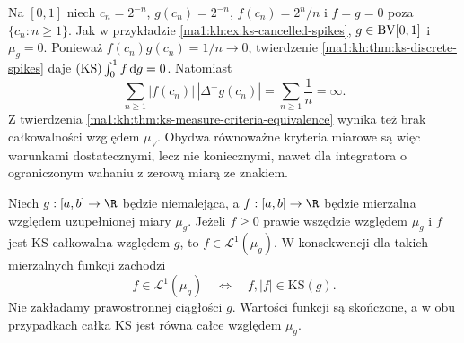 \begin{przyklad}\label{ma1:kh:ex:ks-nonsummable-spikes}
Na $[0,1]$ niech $c_n=2^{-n}$, $g(c_n)=2^{-n}$, $f(c_n)=2^n/n$ i $f=g=0$ poza $\{c_n:n\ge1\}$. Jak w przykładzie \ref{ma1:kh:ex:ks-cancelled-spikes}, $g\in\mathrm{BV}[0,1]$ i $\mu_g=0$. Ponieważ $f(c_n)g(c_n)=1/n\to0$, twierdzenie \ref{ma1:kh:thm:ks-discrete-spikes} daje $(\mathrm{KS})\int_0^1 f\,\mathrm dg=0$. Natomiast
\[
 \sum_{n\ge1}|f(c_n)|\,|\Delta^+g(c_n)|=\sum_{n\ge1}\frac1n=\infty.
\]
Z twierdzenia \ref{ma1:kh:thm:ks-measure-criteria-equivalence} wynika też brak całkowalności względem $\mu_V$. Obydwa równoważne kryteria miarowe są więc warunkami dostatecznymi, lecz nie koniecznymi, nawet dla integratora o ograniczonym wahaniu z zerową miarą ze znakiem.
\end{przyklad}
\begin{twierdzenie}\label{ma1:kh:thm:ks-absolute-monotone}
Niech $g:[a,b]\to\R$ będzie niemalejąca, a $f:[a,b]\to\R$ będzie mierzalna względem uzupełnionej miary $\mu_g$. Jeżeli $f\ge0$ prawie wszędzie względem $\mu_g$ i $f$ jest KS-całkowalna względem $g$, to $f\in\mathcal L^1(\mu_g)$. W konsekwencji dla takich mierzalnych funkcji zachodzi
\[
 f\in\mathcal L^1(\mu_g)\quad\Longleftrightarrow\quad
 f,|f|\in\mathrm{KS}(g).
\]
Nie zakładamy prawostronnej ciągłości $g$. Wartości funkcji są skończone, a w obu przypadkach całka KS jest równa całce względem $\mu_g$.
\end{twierdzenie}

